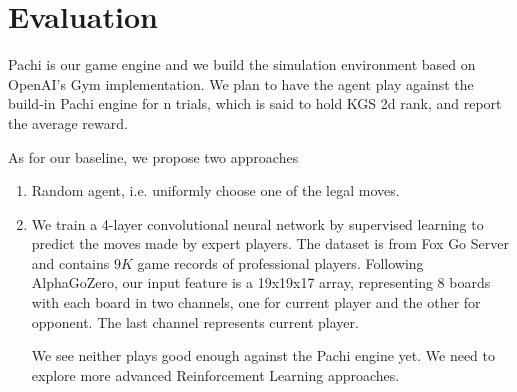 \documentclass{article}
\begin{document}
\section{Evaluation}
Pachi \cite{baudivs2011pachi} is our game engine and we build the simulation environment based on OpenAI's Gym \cite{brockman2016openai} implementation. We plan to have the agent play against the build-in Pachi engine for n trials, which is said to hold KGS 2d rank, and report the average reward.

As for our baseline, we propose two approaches
\begin{enumerate}
  \item
    Random agent, i.e. uniformly choose one of the legal moves.
  \item
    We train a 4-layer convolutional neural network by supervised learning to predict the moves made by expert players. The dataset is from Fox Go Server \cite{FoxGoServer} and contains $9K$ game records of professional players. Following AlphaGoZero, our input feature is a 19x19x17 array, representing 8 boards with each board in two channels, one for current player and the other for opponent. The last channel represents current player.

  We see neither plays good enough against the Pachi engine yet. We need to explore more advanced Reinforcement Learning approaches.
    
\end{enumerate}



 

\end{document}
